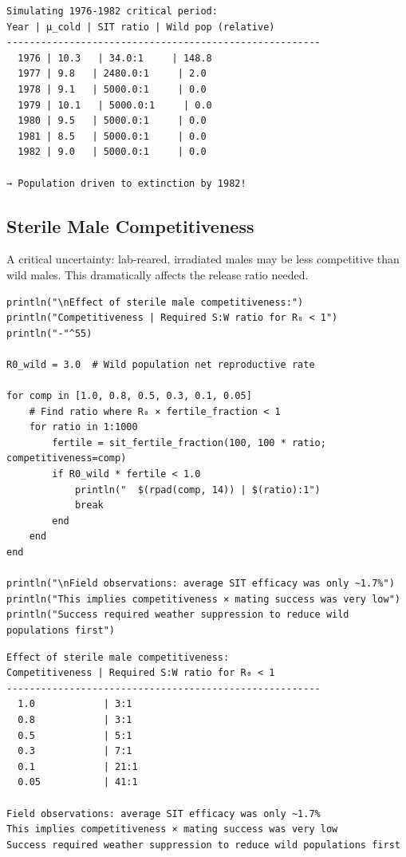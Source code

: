 \begin{verbatim}
Simulating 1976-1982 critical period:
Year | µ_cold | SIT ratio | Wild pop (relative)
-------------------------------------------------------
  1976 | 10.3   | 34.0:1     | 148.8
  1977 | 9.8   | 2480.0:1     | 2.0
  1978 | 9.1   | 5000.0:1     | 0.0
  1979 | 10.1   | 5000.0:1     | 0.0
  1980 | 9.5   | 5000.0:1     | 0.0
  1981 | 8.5   | 5000.0:1     | 0.0
  1982 | 9.0   | 5000.0:1     | 0.0

→ Population driven to extinction by 1982!
\end{verbatim}



\subsection{Sterile Male Competitiveness}



\label{14702580262542812874}{}


A critical uncertainty: lab-reared, irradiated males may be less competitive than wild males. This dramatically affects the release ratio needed.




\begin{verbatim}
println("\nEffect of sterile male competitiveness:")
println("Competitiveness | Required S:W ratio for R₀ < 1")
println("-"^55)

R0_wild = 3.0  # Wild population net reproductive rate

for comp in [1.0, 0.8, 0.5, 0.3, 0.1, 0.05]
    # Find ratio where R₀ × fertile_fraction < 1
    for ratio in 1:1000
        fertile = sit_fertile_fraction(100, 100 * ratio; competitiveness=comp)
        if R0_wild * fertile < 1.0
            println("  $(rpad(comp, 14)) | $(ratio):1")
            break
        end
    end
end

println("\nField observations: average SIT efficacy was only ~1.7%")
println("This implies competitiveness × mating success was very low")
println("Success required weather suppression to reduce wild populations first")
\end{verbatim}




\begin{verbatim}
Effect of sterile male competitiveness:
Competitiveness | Required S:W ratio for R₀ < 1
-------------------------------------------------------
  1.0            | 3:1
  0.8            | 3:1
  0.5            | 5:1
  0.3            | 7:1
  0.1            | 21:1
  0.05           | 41:1

Field observations: average SIT efficacy was only ~1.7%
This implies competitiveness × mating success was very low
Success required weather suppression to reduce wild populations first
\end{verbatim}




